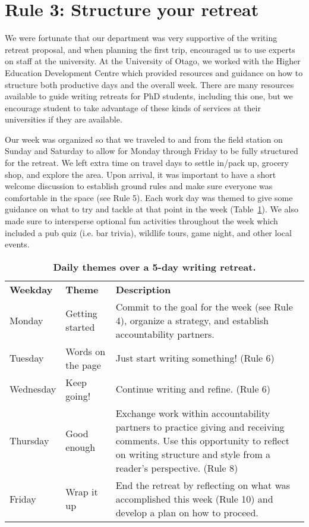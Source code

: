 \documentclass[10pt,letterpaper]{article}
\newlength\savedwidth
\newcommand\thickhline{\noalign{\global\savedwidth\arrayrulewidth\global\arrayrulewidth 2pt}%
\hline
\noalign{\global\arrayrulewidth\savedwidth}}
\begin{document}
\section*{Rule 3: Structure your retreat}

We were fortunate that our department was very supportive of the writing retreat proposal, and when planning the first trip, encouraged us to use experts on staff at the university. At the University of Otago, we worked with the Higher Education Development Centre which provided resources and guidance on how to structure both productive days and the overall week. There are many resources available to guide writing retreats for PhD students, including this one, but we encourage student to take advantage of these kinds of services at their universities if they are available.

Our week was organized so that we traveled to and from the field station on Sunday and Saturday to allow for Monday through Friday to be fully structured for the retreat. We left extra time on travel days to settle in/pack up, grocery shop, and explore the area. Upon arrival, it was important to have a short welcome discussion to establish ground rules and make sure everyone was comfortable in the space (see Rule 5). Each work day was themed to give some guidance on what to try and tackle at that point in the week (Table~\ref{table1}). We also made sure to intersperse optional fun activities throughout the week which included a pub quiz (i.e. bar trivia), wildlife tours, game night, and other local events.

\begin{table}[!ht]
\centering
\caption{
{\bf Daily themes over a 5-day writing retreat.}}
\begin{tabular}{p{1in}p{2in}p{2in}}
\hline
{\bf Weekday} & {\bf Theme} & {\bf Description}\\ \thickhline
Monday & Getting started & Commit to the goal for the week (see Rule 4), organize a strategy, and establish accountability partners.\\ \hline
Tuesday & Words on the page & Just start writing something! (Rule 6)\\ \hline
Wednesday & Keep going! & Continue writing and refine. (Rule 6)\\ \hline
Thursday & Good enough & Exchange work within accountability partners to practice giving and receiving comments. Use this opportunity to reflect on writing structure and style from a reader’s perspective. (Rule 8)\\ \hline
Friday & Wrap it up & End the retreat by reflecting on what was accomplished this week (Rule 10) and develop a plan on how to proceed.\\ \hline
\end{tabular}
\label{table1}
\end{table}
\end{document}
